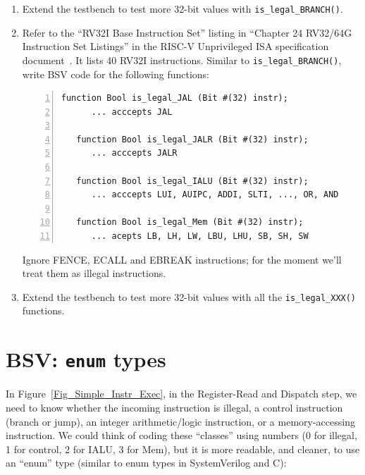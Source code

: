\begin{enumerate}

\item Extend the testbench to test more 32-bit values with
\verb|is_legal_BRANCH()|.

\item Refer to the ``RV32I Base Instruction Set'' listing in ``Chapter
24 RV32/64G Instruction Set Listings'' in the RISC-V Unprivileged ISA
specification document~\cite{RISCV_Unpriv_2019_12_13}.  It lists 40
RV32I instructions.  Similar to \verb|is_legal_BRANCH()|, write BSV
code for the following functions:

\begin{Verbatim}[frame=single, numbers=left]
   function Bool is_legal_JAL (Bit #(32) instr);
      ... acccepts JAL

   function Bool is_legal_JALR (Bit #(32) instr);
      ... acccepts JALR

   function Bool is_legal_IALU (Bit #(32) instr);
      ... acccepts LUI, AUIPC, ADDI, SLTI, ..., OR, AND

   function Bool is_legal_Mem (Bit #(32) instr);
      ... acepts LB, LH, LW, LBU, LHU, SB, SH, SW
\end{Verbatim}

Ignore FENCE, ECALL and EBREAK instructions; for the moment we'll
treat them as illegal instructions.

\item Extend the testbench to test more 32-bit values with all the
\verb|is_legal_XXX()| functions.

\end{enumerate}


\section{BSV: {\tt enum} types}

\label{BSV_enum_types}


In Figure~\ref{Fig_Simple_Instr_Exec}, in the Register-Read
and Dispatch step, we need to know whether the incoming instruction is
illegal, a control instruction (branch or jump), an integer
arithmetic/logic instruction, or a memory-accessing instruction.  We
could think of coding these ``classes'' using numbers (0 for illegal,
1 for control, 2 for IALU, 3 for Mem), but it is more readable, and
cleaner, to use an ``enum'' type (similar to enum types in
SystemVerilog and C):


